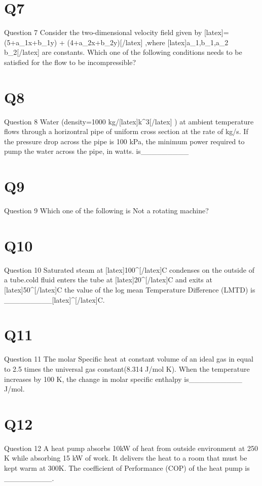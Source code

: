 \section*{Q7}
Question 7 Consider the two-dimensional velocity field  given by [latex]=(5+a\_{1}x+b\_{1}y)\: + \:  (4+a\_{2}x+b\_{2}y)[/latex] ,where [latex]a\_1,b\_1,a\_2 b\_2[/latex]  are constants. Which one of the following conditions needs to be satisfied for the flow to be  incompressible?

\section*{Q8}
Question 8 Water (density=1000 kg/[latex]k^{3}[/latex] ) at ambient temperature flows through a horizontral  pipe of uniform cross section at the rate  of  kg/s. If the pressure drop across the pipe is  100 kPa, the minimum power required to pump the water across the pipe, in watts. is\_\_\_\_\_\_\_\_\_

\section*{Q9}
Question 9 Which one of the following is Not a rotating machine?

\section*{Q10}
Question 10 Saturated steam at [latex]100^{\circ}[/latex]C condenses  on the outside of a tube.cold fluid enters the tube at  [latex]20^{\circ}[/latex]C and exits at [latex]50^{\circ}[/latex]C the value of the log mean Temperature Difference (LMTD) is \_\_\_\_\_\_\_\_\_[latex]^{\circ}[/latex]C.

\section*{Q11}
Question 11 The molar Specific heat at constant volume of an ideal gas in equal to 2.5 times the universal gas constant(8.314 J/mol K). When the temperature increases by 100 K, the change in molar specific enthalpy is\_\_\_\_\_\_\_\_\_\_ J/mol.

\section*{Q12}
Question 12 A heat pump absorbs 10kW of heat from outside environment at 250 K while absorbing 15 kW of work. It delivers the heat to a room that must be kept warm at 300K. The coefficient of Performance (COP) of the heat pump is \_\_\_\_\_\_\_\_\_.

